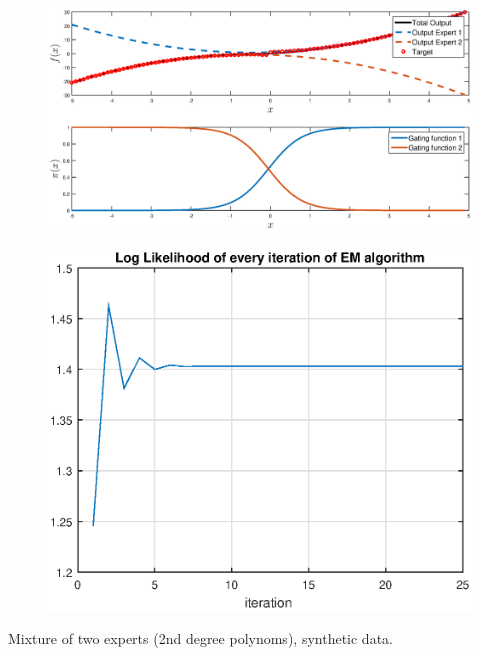 \documentclass{beamer}
\begin{document}
\begin{frame}
\vspace{-5ex}
\begin{figure}[ht]
    \centering
    \includegraphics[width=0.95\linewidth]{fig/TwoExperts.eps}
\end{figure}
\vspace{-2ex}
\begin{minipage}[h]{0.49\linewidth}
\begin{figure}
    \centering
    \includegraphics[width=\linewidth]{fig/Loglikelihood_convergence.eps}
\end{figure}
\end{minipage}
\hfill
\begin{minipage}[h]{0.49\linewidth}
Mixture of two experts (2nd degree polynoms), synthetic data.
\end{minipage}
\end{frame}
\end{document}
